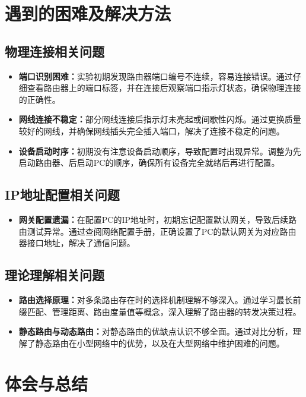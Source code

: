 \documentclass[a4paper]{article}
\begin{document}
\section{遇到的困难及解决方法}

\subsection{物理连接相关问题}
\begin{itemize}
    \item \textbf{端口识别困难：}实验初期发现路由器端口编号不连续，容易连接错误。通过仔细查看路由器上的端口标签，并在连接后观察端口指示灯状态，确保物理连接的正确性。
    \item \textbf{网线连接不稳定：}部分网线连接后指示灯未亮起或间歇性闪烁。通过更换质量较好的网线，并确保网线插头完全插入端口，解决了连接不稳定的问题。
    \item \textbf{设备启动时序：}初期没有注意设备启动顺序，导致配置时出现异常。调整为先启动路由器、后启动PC的顺序，确保所有设备完全就绪后再进行配置。
\end{itemize}

\subsection{IP地址配置相关问题}
\begin{itemize}
    \item \textbf{网关配置遗漏：}在配置PC的IP地址时，初期忘记配置默认网关，导致后续路由测试异常。通过查阅网络配置手册，正确设置了PC的默认网关为对应路由器接口地址，解决了通信问题。
\end{itemize}

\subsection{理论理解相关问题}
\begin{itemize}
    \item \textbf{路由选择原理：}对多条路由存在时的选择机制理解不够深入。通过学习最长前缀匹配、管理距离、路由度量值等概念，深入理解了路由器的转发决策过程。
    \item \textbf{静态路由与动态路由：}对静态路由的优缺点认识不够全面。通过对比分析，理解了静态路由在小型网络中的优势，以及在大型网络中维护困难的问题。
\end{itemize}

\section{体会与总结}
\end{document}
